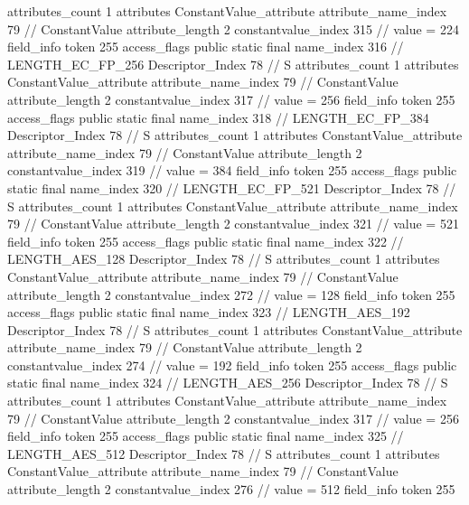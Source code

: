 {{{{{				attributes_count	1
				attributes {
				ConstantValue_attribute {
					attribute_name_index	79		// ConstantValue
					attribute_length	2
					constantvalue_index	315		// value = 224
				}
				}
			}
			field_info {
				token	255
				access_flags	public static final
				name_index	316		// LENGTH_EC_FP_256
				Descriptor_Index	78		// S
				attributes_count	1
				attributes {
				ConstantValue_attribute {
					attribute_name_index	79		// ConstantValue
					attribute_length	2
					constantvalue_index	317		// value = 256
				}
				}
			}
			field_info {
				token	255
				access_flags	public static final
				name_index	318		// LENGTH_EC_FP_384
				Descriptor_Index	78		// S
				attributes_count	1
				attributes {
				ConstantValue_attribute {
					attribute_name_index	79		// ConstantValue
					attribute_length	2
					constantvalue_index	319		// value = 384
				}
				}
			}
			field_info {
				token	255
				access_flags	public static final
				name_index	320		// LENGTH_EC_FP_521
				Descriptor_Index	78		// S
				attributes_count	1
				attributes {
				ConstantValue_attribute {
					attribute_name_index	79		// ConstantValue
					attribute_length	2
					constantvalue_index	321		// value = 521
				}
				}
			}
			field_info {
				token	255
				access_flags	public static final
				name_index	322		// LENGTH_AES_128
				Descriptor_Index	78		// S
				attributes_count	1
				attributes {
				ConstantValue_attribute {
					attribute_name_index	79		// ConstantValue
					attribute_length	2
					constantvalue_index	272		// value = 128
				}
				}
			}
			field_info {
				token	255
				access_flags	public static final
				name_index	323		// LENGTH_AES_192
				Descriptor_Index	78		// S
				attributes_count	1
				attributes {
				ConstantValue_attribute {
					attribute_name_index	79		// ConstantValue
					attribute_length	2
					constantvalue_index	274		// value = 192
				}
				}
			}
			field_info {
				token	255
				access_flags	public static final
				name_index	324		// LENGTH_AES_256
				Descriptor_Index	78		// S
				attributes_count	1
				attributes {
				ConstantValue_attribute {
					attribute_name_index	79		// ConstantValue
					attribute_length	2
					constantvalue_index	317		// value = 256
				}
				}
			}
			field_info {
				token	255
				access_flags	public static final
				name_index	325		// LENGTH_AES_512
				Descriptor_Index	78		// S
				attributes_count	1
				attributes {
				ConstantValue_attribute {
					attribute_name_index	79		// ConstantValue
					attribute_length	2
					constantvalue_index	276		// value = 512
				}
				}
			}
			field_info {
				token	255
}}}}}
